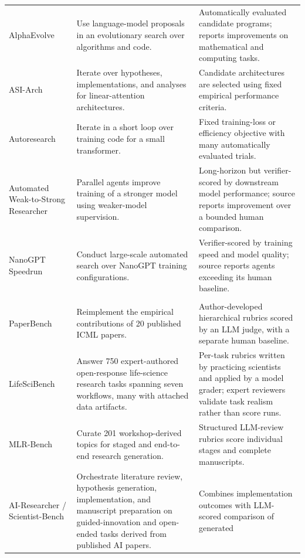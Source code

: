 {\begin{longtable}{@{}P{0.21\textwidth}P{0.30\textwidth}P{0.39\textwidth}@{}}
AlphaEvolve~\citep{alphaevolve} & Use language-model proposals in an
evolutionary search over algorithms and code. & Automatically evaluated
candidate programs; reports improvements on mathematical and computing tasks. \\
ASI-Arch~\citep{asiarch} & Iterate over hypotheses, implementations, and
analyses for linear-attention architectures. & Candidate architectures are
selected using fixed empirical performance criteria. \\
Autoresearch~\citep{autoresearch} & Iterate in a short loop over training code
for a small transformer. & Fixed training-loss or efficiency objective with
many automatically evaluated trials. \\
Automated Weak-to-Strong Researcher~\citep{weakstrongresearcher} & Parallel
agents improve training of a stronger model using weaker-model supervision. &
Long-horizon but verifier-scored by downstream model performance; source
reports improvement over a bounded human comparison. \\
NanoGPT Speedrun~\citep{nanogptspeedrun} & Conduct large-scale automated search
over NanoGPT training configurations. & Verifier-scored by training speed and
model quality; source reports agents exceeding its human baseline. \\
\addlinespace[4pt]
 \\
\addlinespace[2pt]
PaperBench~\citep{paperbench} & Reimplement the empirical contributions of 20
published ICML papers. & Author-developed hierarchical rubrics scored by an
LLM judge, with a separate human baseline. \\
LifeSciBench~\citep{lifescibench} & Answer 750 expert-authored open-response
life-science research tasks spanning seven workflows, many with attached data
artifacts. & Per-task rubrics written by practicing scientists and applied by a
model grader; expert reviewers validate task realism rather than score runs. \\
MLR-Bench~\citep{mlrbench} & Curate 201 workshop-derived topics for staged and
end-to-end research generation. & Structured LLM-review rubrics score
individual stages and complete manuscripts. \\
AI-Researcher / Scientist-Bench~\citep{airesearcher} & Orchestrate literature
review, hypothesis generation, implementation, and manuscript preparation on
guided-innovation and open-ended tasks derived from published AI papers. &
Combines implementation outcomes with LLM-scored comparison of generated

\end{longtable}}

